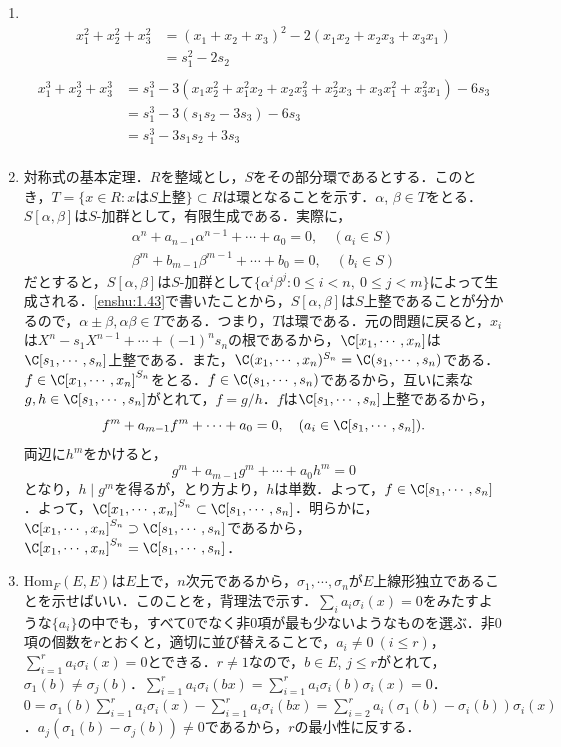 \documentclass[a4paper,10pt]{ltjsarticle}
\begin{document}
\begin{enumerate}
  \item \label{enshu:2.6} \
  \begin{align*}
    x_1^2+x_2^2+x_3^2 &= (x_1+x_2+x_3)^2 - 2(x_1x_2+x_2x_3+x_3x_1) \\
    &= s_1^2 - 2s_2 \\
  \end{align*}
  \begin{align*}
    x_1^3+x_2^3+x_3^3 &= s_1^3 - 3(x_1x_2^2 + x_1^2x_2+x_2x_3^2+x_2^2x_3+x_3x_1^2+x_3^2x_1) - 6s_3 \\
    &= s_1^3 - 3(s_1s_2 - 3s_3) - 6s_3 \\
    &= s_1^3 - 3s_1s_2 + 3s_3 \\
  \end{align*}
  \item \label{enshu:2.7} 対称式の基本定理．$R$を整域とし，$S$をその部分環であるとする．このとき，$T=\{x\in R: xはS上整\}\subset R$は環となることを示す．$\alpha$, $\beta \in T$をとる．$S[\alpha, \beta]$は$S$-加群として，有限生成である．実際に，
  \begin{align*}
    \alpha^n + a_{n-1}\alpha^{n-1} + \cdots + a_0 = 0, \quad (a_i \in S) \\
    \beta^m + b_{m-1}\beta^{m-1} + \cdots + b_0 = 0, \quad (b_i \in S)
  \end{align*}
  だとすると，$S[\alpha, \beta]$は$S$-加群として$\{\alpha^i\beta^j : 0\le i < n,\ 0 \le j < m\}$によって生成される．\ref{enshu:1.43}で書いたことから，$S[\alpha, \beta]$は$S$上整であることが分かるので，$\alpha \pm \beta, \alpha\beta \in T$である．つまり，$T$は環である．元の問題に戻ると，$x_i$は$X^n - s_1X^{n-1} +\cdots+(-1)^ns_n$の根であるから，$\C[x_1, \cdots, x_n]$は$\C[s_1, \cdots, s_n]$上整である．また，$\C(x_1, \cdots, x_n)^{S_n} = \C(s_1, \cdots, s_n)$である．$f\in\C[x_1, \cdots, x_n]^{S_n}$をとる．$f\in \C(s_1, \cdots, s_n)$であるから，互いに素な$g, h\in \C[s_1, \cdots, s_n]$がとれて，$f=g/h$．$f$は$\C[s_1, \cdots, s_n]$上整であるから，
  \[ f^m + a_{m-1}f^m + \cdots + a_0 = 0, \quad (a_i \in \C[s_1, \cdots, s_n]). \]
  両辺に$h^m$をかけると，
  \[ g^m + a_{m-1}g^m + \cdots + a_0h^m = 0 \]
  となり，$h\mid g^m$を得るが，とり方より，$h$は単数．よって，$f \in \C[s_1, \cdots, s_n]$．よって，$\C[x_1, \cdots, x_n]^{S_n} \subset \C[s_1, \cdots, s_n]$．明らかに，$\C[x_1, \cdots, x_n]^{S_n} \supset \C[s_1, \cdots, s_n]$であるから，$\C[x_1, \cdots, x_n]^{S_n} = \C[s_1, \cdots, s_n]$．
  \item \label{enshu:2.8} $\mathrm{Hom}_F(E, E)$は$E$上で，$n$次元であるから，$\sigma_1, \cdots, \sigma_n$が$E$上線形独立であることを示せばいい．このことを，背理法で示す．$\sum_ia_i\sigma_i(x)=0$をみたすような$\{a_i\}$の中でも，すべて$0$でなく非$0$項が最も少ないようなものを選ぶ．非$0$項の個数を$r$とおくと，適切に並び替えることで，$a_i \ne 0 \ (i \le r)$，$\sum_{i=1}^{r}a_i\sigma_i(x)=0$とできる．$r\ne1$なので，$b\in E$, $j \le r$がとれて，$\sigma_1(b) \ne \sigma_j(b)$．$\sum_{i=1}^ra_i\sigma_i(bx)=\sum_{i=1}^{r}a_i\sigma_i(b)\sigma_i(x) = 0$．$0=\sigma_1(b)\sum_{i=1}^{r}a_i\sigma_i(x) - \sum_{i=1}^ra_i\sigma_i(bx) = \sum_{i=2}^ra_i(\sigma_1(b)-\sigma_i(b))\sigma_i(x)$．$a_j(\sigma_1(b)-\sigma_j(b))\ne0$であるから，$r$の最小性に反する．

\end{enumerate}
\end{document}
